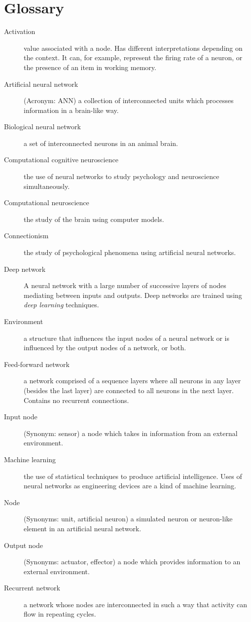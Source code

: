 \chapter*{Glossary}
\begin{description}

\item[Activation] value associated with a node. Has different interpretations depending on the context. It can, for example, represent the firing rate of a neuron, or the presence of an item in working memory.
\item[Artificial neural network] (Acronym: ANN) a collection of interconnected units which processes information in a brain-like way.
\item[Biological neural network] a set of interconnected neurons in an animal brain.
\item[Computational cognitive neuroscience] the use of neural networks to study psychology and neuroscience simultaneously.
\item[Computational neuroscience] the study of the brain using computer models.
\item[Connectionism] the study of psychological phenomena using artificial neural networks.
\item[Deep network] A neural network with a large number of successive layers of nodes mediating between inputs and outputs. Deep networks are trained using \emph{deep learning} techniques.
\item[Environment] a structure that influences the input nodes of a neural network or is influenced by the output nodes of a network, or both.
\item[Feed-forward network] a network comprised of a sequence layers where all neurons in any layer (besides the last layer) are connected to all neurons in the next layer. Contains no recurrent connections.
\item[Input node] (Synonym: sensor) a node which takes in information from an external environment. 
\item[Machine learning] the use of statistical techniques to produce artificial intelligence. Uses of neural networks as engineering devices are a kind of machine learning.
\item[Node] (Synonyms: unit, artificial neuron) a simulated neuron or neuron-like element in an artificial neural network. 
\item[Output node] (Synonyms: actuator, effector) a node which provides information to an external environment. 
\item[Recurrent network] a network whose nodes are interconnected in such a way that activity can flow in repeating cycles.

\end{description}
